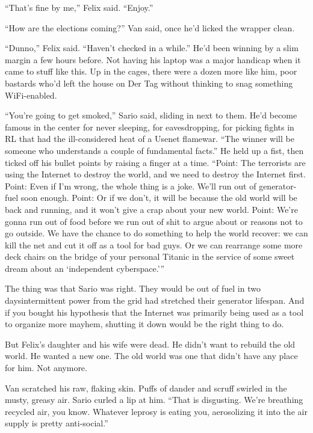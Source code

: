 “That’s fine by me,” Felix said. “Enjoy.”

“How are the elections coming?” Van said, once he’d licked the
wrapper clean.

“Dunno,” Felix said. “Haven’t checked in a while.” He’d been
winning by a slim margin a few hours before. Not having his laptop
was a major handicap when it came to stuff like this. Up in the
cages, there were a dozen more like him, poor bastards who’d left
the house on Der Tag without thinking to snag something
WiFi-enabled.

“You’re going to get smoked,” Sario said, sliding in next to them.
He’d become famous in the center for never sleeping, for
eavesdropping, for picking fights in RL that had the ill-considered
heat of a Usenet flamewar. “The winner will be someone who
understands a couple of fundamental facts.” He held up a fist, then
ticked off his bullet points by raising a finger at a time. “Point:
The terrorists are using the Internet to destroy the world, and we
need to destroy the Internet first. Point: Even if I’m wrong, the
whole thing is a joke. We’ll run out of generator-fuel soon enough.
Point: Or if we don’t, it will be because the old world will be
back and running, and it won’t give a crap about your new world.
Point: We’re gonna run out of food before we run out of shit to
argue about or reasons not to go outside. We have the chance to do
something to help the world recover: we can kill the net and cut it
off as a tool for bad guys. Or we can rearrange some more deck
chairs on the bridge of your personal Titanic in the service of
some sweet dream about an ‘independent cyberspace.’”

The thing was that Sario was right. They would be out of fuel in
two days\dash{}intermittent power from the grid had stretched their
generator lifespan. And if you bought his hypothesis that the
Internet was primarily being used as a tool to organize more
mayhem, shutting it down would be the right thing to do.

But Felix’s daughter and his wife were dead. He didn’t want to
rebuild the old world. He wanted a new one. The old world was one
that didn’t have any place for him. Not anymore.

Van scratched his raw, flaking skin. Puffs of dander and scruff
swirled in the musty, greasy air. Sario curled a lip at him. “That
is disgusting. We’re breathing recycled air, you know. Whatever
leprosy is eating you, aerosolizing it into the air supply is
pretty anti-social.”

